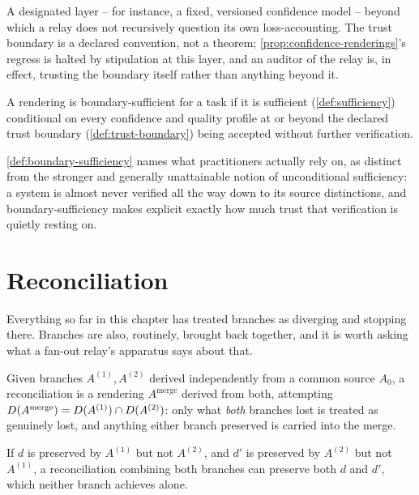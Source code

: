 \begin{definition}
\label{def:trust-boundary}
A designated layer -- for instance, a fixed, versioned confidence model
-- beyond which a relay does not recursively question its own
loss-accounting. The trust boundary is a declared convention, not a
theorem; \cref{prop:confidence-renderings}'s regress is halted by
stipulation at this layer, and an auditor of the relay is, in effect,
trusting the boundary itself rather than anything beyond it.
\end{definition}

\begin{definition}
\label{def:boundary-sufficiency}
A rendering is boundary-sufficient for a task if it is sufficient
(\cref{def:sufficiency}) conditional on every confidence and quality
profile at or beyond the declared trust boundary
(\cref{def:trust-boundary}) being accepted without further verification.
\end{definition}

\cref{def:boundary-sufficiency} names what practitioners actually rely
on, as distinct from the stronger and generally unattainable notion of
unconditional sufficiency: a system is almost never verified all the way
down to its source distinctions, and boundary-sufficiency makes explicit
exactly how much trust that verification is quietly resting on.

\section{Reconciliation}
\label{sec:reconciliation}

Everything so far in this chapter has treated branches as diverging and
stopping there. Branches are also, routinely, brought back together, and
it is worth asking what a fan-out relay's apparatus says about that.

\begin{definition}[Reconciliation]
\label{def:reconciliation}
Given branches $A^{(1)}, A^{(2)}$ derived independently from a common
source $A_0$, a reconciliation is a rendering $A^{\mathrm{merge}}$
derived from both, attempting
$D(A^{\mathrm{merge}}) = D(A^{(1)}) \cap D(A^{(2)})$:
only what \emph{both} branches lost is treated as genuinely lost, and
anything either branch preserved is carried into the merge.
\end{definition}

\begin{proposition}
\label{prop:reconciliation-recovers}
If $d$ is preserved by $A^{(1)}$ but not $A^{(2)}$, and $d'$ is preserved
by $A^{(2)}$ but not $A^{(1)}$, a reconciliation combining both branches
can preserve both $d$ and $d'$, which neither branch achieves alone.
\end{proposition}

